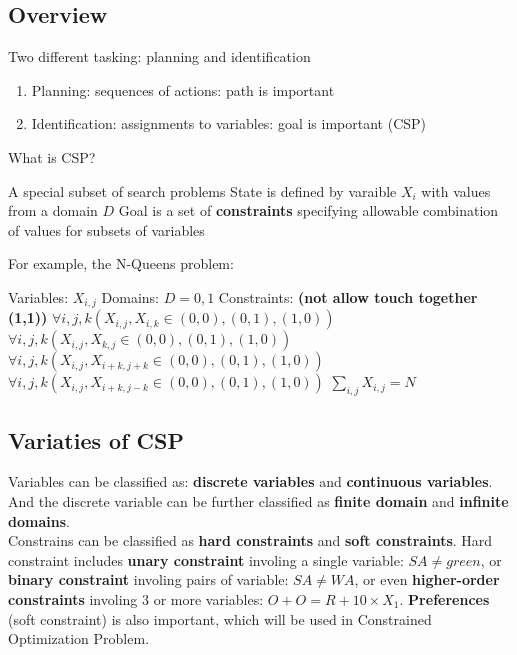 \subsection{Overview}
Two different tasking: planning and identification
\begin{enumerate}
    \item Planning: sequences of actions: path is important
    \item Identification: assignments to variables: goal is important (CSP)
\end{enumerate}

\noindent
What is CSP?
\begin{outline}
    \1 A special subset of search problems
    \1 State is defined by varaible $X_{i}$ with values from a domain $D$
    \1 Goal is a set of \textbf{constraints} specifying allowable combination of values for subsets of variables
\end{outline}

\noindent
For example, the N-Queens problem: \\
\begin{outline}
    \1 Variables: $X_{i,j}$
    \1 Domains: $D = {0,1}$
    \1 Constraints: \textbf{(not allow touch together (1,1))}
        \2 $\forall i,j,k (X_{i,j},X_{i,k} \in {(0,0),(0,1),(1,0)})$
        \2 $\forall i,j,k (X_{i,j},X_{k,j} \in {(0,0),(0,1),(1,0)})$
        \2 $\forall i,j,k (X_{i,j},X_{i+k,j+k} \in {(0,0),(0,1),(1,0)})$
        \2 $\forall i,j,k (X_{i,j},X_{i+k,j-k} \in {(0,0),(0,1),(1,0)})$
        \2 $\sum_{i,j} X_{i,j} = N$
\end{outline}

\subsection{Variaties of CSP}
Variables can be classified as: \textbf{discrete variables} and \textbf{continuous variables}. And the discrete variable can be further classified as \textbf{finite domain} and \textbf{infinite domains}. \\
Constrains can be classified as \textbf{hard constraints} and \textbf{soft constraints}. Hard constraint includes \textbf{unary constraint} involing a single variable: $SA \neq green$, or \textbf{binary constraint} involing pairs of variable: $SA \neq WA$, or even \textbf{higher-order constraints} involing 3 or more variables: $O + O = R + 10 \times X_{1}$. \textbf{Preferences} (soft constraint) is also important, which will be used in Constrained Optimization Problem.

